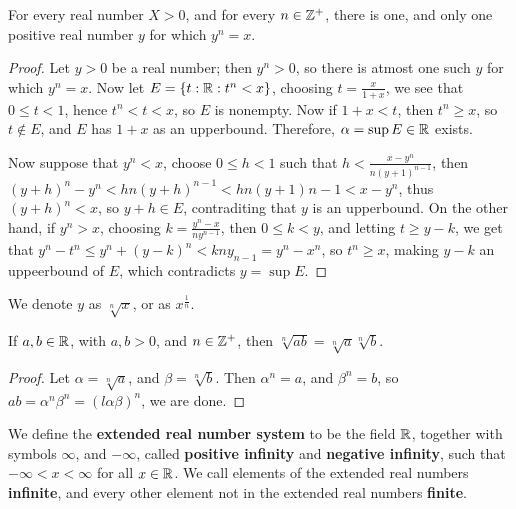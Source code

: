 \begin{theorem}\label{1.3.4}
    For every real number $X>0$, and for every  $n \in \mathbb{Z}^+$, there is one, and only one 
    positive real number  $y$ for which  $y^n=x$.
\end{theorem}
\begin{proof}
    Let $y>0$ be a real number; then $y^n>0$, so there is atmost one such  $y$ for which 
    $y^n=x$. Now let  $E=\{t:\mathbb{R}: t^n<x\}$, choosing  $t=\frac{x}{1+x}$, we see that 
    $0 \leq t<1$, hence  $t^n<t<x$, so $E$ is nonempty. Now if $1+x<t$, then $t^n \geq x$, so 
    $t \notin E$, and  $E$ has $1+x$ as an upperbound. Therefore, $\alpha=\sup{E} \in \mathbb{R}$ exists.

    Now suppose that  $y^n<x$, choose  $0 \leq h<1$ such that  $h<\frac{x-y^n}{n(y+1)^{n-1}}$, 
    then $(y+h)^n-y^n<hn(y+h)^{n-1}<hn(y+1)^{}n-1<x-y^n$, thus  $(y+h)^n<x$, so  $y+h \in E$, 
    contraditing that  $y$ is an upperbound. On the other hand, if  $y^n>x$, choosing 
    $k=\frac{y^n-x}{ny^{n-1}}$, then $0 \leq k<y$, and letting  $t \geq y-k$, we get that 
    $y^n-t^n \leq y^n+(y-k)^n<kny_{n-1}=y^n-x^n$, so $t^n \geq x$, making  $y-k$ an uppeerbound 
    of  $E$, which contradicts  $y=\sup{E}$.
\end{proof}
\begin{remark} 
    We denote $y$ as  $\sqrt[n]{x}$, or as  $x^{\frac{1}{n}}$.
\end{remark}

\begin{corollary}
    If $a,b \in \mathbb{R}$, with  $a,b>0$, and  $n \in \mathbb{Z}^+$, then  $\sqrt[n]{ab}=\sqrt[n]{a}\sqrt[n]{b}$.
\end{corollary}
\begin{proof}
    Let $\alpha=\sqrt[n]{a}$, and  $\beta=\sqrt[n]{b}$. Then  $\alpha^n=a$, and  $\beta^n=b$, so 
    $ab=\alpha^n\beta^n=(l\alpha\beta)^n$, we are done.
\end{proof}

\begin{definition}
    We define the \textbf{extended real number system} to be the field $\mathbb{R}$, together with symbols 
    $\infty$, and  $-\infty$, called  \textbf{positive infinity} and \textbf{negative infinity}, such that 
    $-\infty<x<\infty$ for all $x \in \mathbb{R}$. We call elements of the extended real numbers \textbf{infinite}, 
    and every other element not in the extended real numbers \textbf{finite}.
\end{definition}

